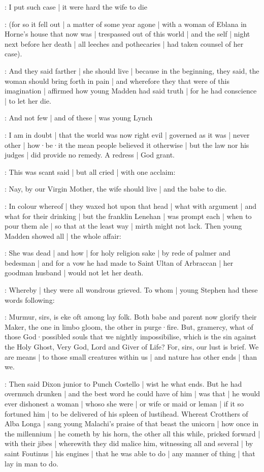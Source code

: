 \madden:
I put such case |
it were hard the wife to die

:
(for so it fell out |
a matter of some year agone |
with a woman of Eblana in Horne's house that now was |
trespassed out of this world |
and the self |
night next before her death |
all leeches and pothecaries |
had taken counsel of her case).

:
And they said farther |
she should live |
because in the beginning,
they said,
the woman should bring forth in pain |
and wherefore they that were of this imagination |
affirmed how young Madden had said truth |
for he had conscience |
to let her die.

:
And not few |
and of these |
was young Lynch

\lynch:
I am in doubt |
that the world was now right evil |
governed as it was |
never other |
how·be·it the mean people believed it otherwise |
but the law nor his judges |
did provide no remedy.
A redress |
God grant.

:
This was scant said |
but all cried |
with one acclaim:

\All:
Nay,
by our Virgin Mother,
the wife should live |
and the babe to die.

:
In colour whereof |
they waxed hot upon that head |
what with argument |
and what for their drinking |
but the franklin Lenehan |
was prompt each |
when to pour them ale |
so that at the least way |
mirth might not lack.
Then young Madden showed all |
the whole affair:

\madden:
She was dead |
and how |
for holy religion sake |
by rede of palmer and bedesman |
and for a vow he had made to Saint Ultan of Arbraccan |
her goodman husband |
would not let her death.

:
Whereby |
they were all wondrous grieved.
To whom |
young Stephen had these words following:

\stephen:
Murmur,
sirs,
is eke oft among lay folk.
Both babe and parent now glorify their Maker,
the one in limbo gloom,
the other in purge·fire.
But,
gramercy,
what of those God·possibled souls that we nightly impossibilise,
which is the sin against the Holy Ghost,
Very God,
Lord and Giver of Life?
For,
sirs,
our lust is brief.
We are means |
to those small creatures within us |
and nature has other ends |
than we.

:
Then said Dixon junior to Punch Costello |
wist he what ends.
But he had overmuch drunken |
and the best word he could have of him |
was that |
he would ever dishonest a woman |
whoso she were |
or wife or maid or leman |
if it so fortuned him |
to be delivered of his spleen of lustihead.
Whereat Crotthers of Alba Longa |
sang young Malachi's praise of that beast the unicorn |
how once in the millennium |
he cometh by his horn,
the other all this while,
pricked forward |
with their jibes |
wherewith they did malice him,
witnessing all and several |
by saint Foutinus |
his engines |
that he was able to do |
any manner of thing |
that lay in man to do.

